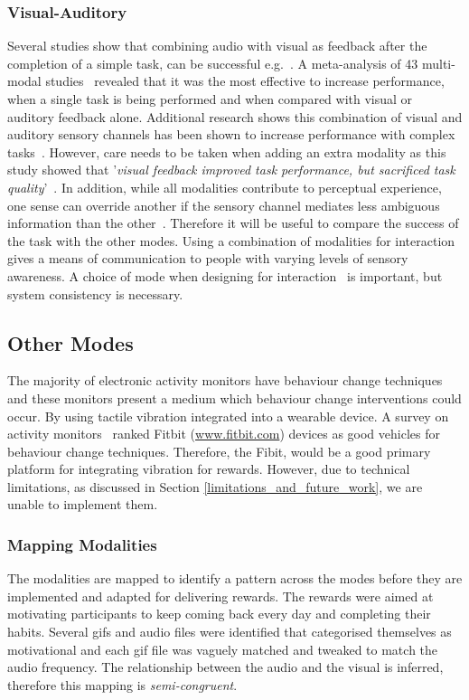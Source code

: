 \subsubsection{Visual-Auditory}
Several studies show that combining audio with visual as feedback after the completion of a simple task, can be successful e.g.~\cite{benefits_of_audio_visual_1, benefits_of_audio_visual_2}. A meta-analysis of 43 multi-modal studies~\cite{comparing_modalities_effects_of_visual_auditory} revealed that it was the most effective to increase performance, when a single task is being performed and when compared with visual or auditory feedback alone. Additional research shows this combination of visual and auditory sensory channels has been shown to increase performance with complex tasks~\cite{chi_oussama_tap_the_shapetones}. However, care needs to be taken when adding an extra modality as this study showed that '\textit{visual feedback improved task performance, but sacrificed task quality}'~\cite{comparing_modalities_effects_of_visual_auditory}. In addition, while all modalities contribute to perceptual experience, one sense can override another if the sensory channel mediates less ambiguous information than the other~\cite{one_mode_override_another}. Therefore it will be useful to compare the success of the task with the other modes. Using a combination of modalities for interaction gives a means of communication to people with varying levels of sensory awareness. A choice of mode when designing for interaction~\cite{article_user_centred_multimodal_reminders} is important, but system consistency is necessary.


\subsection*{Other Modes}
The majority of electronic activity monitors have behaviour change techniques and these monitors present a medium which behaviour change interventions could occur. By using tactile vibration integrated into a wearable device. A survey on activity monitors~\cite{article_wearable_good} ranked Fitbit (\url{www.fitbit.com}) devices as good vehicles for behaviour change techniques. Therefore, the Fibit, would be a good primary platform for integrating vibration for rewards. However, due to technical limitations, as discussed in Section \ref{limitations_and_future_work}, we are unable to implement them.


\subsubsection*{Mapping Modalities}
The modalities are mapped to identify a pattern across the modes before they are implemented and adapted for delivering rewards. The rewards were aimed at motivating participants to keep coming back every day and completing their habits. Several gifs and audio files were identified that categorised themselves as motivational and each gif file was vaguely matched and tweaked to match the audio frequency. The relationship between the audio and the visual is inferred, therefore this mapping is \textit{semi-congruent}.

